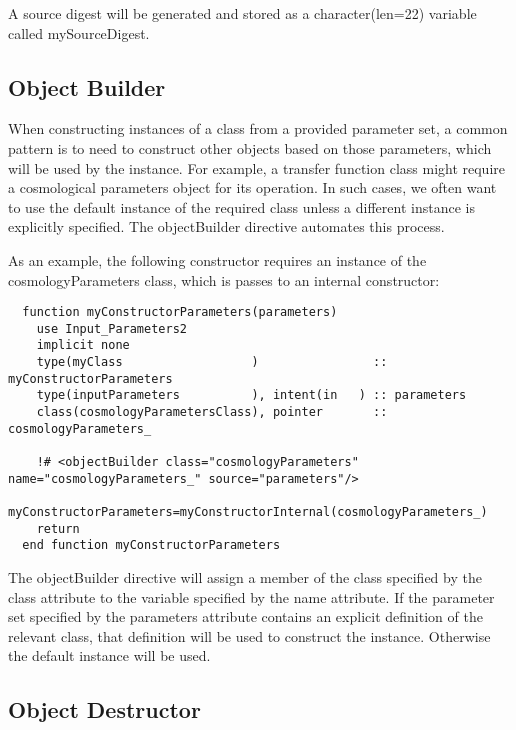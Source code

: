 A source digest will be generated and stored as a {\normalfont \ttfamily character(len=22)} variable called {\normalfont \ttfamily mySourceDigest}.

\subsection{Object Builder}

When constructing instances of a class from a provided parameter set, a common pattern is to need to construct other objects based on those parameters, which will be used by the instance. For example, a transfer function class might require a cosmological parameters object for its operation. In such cases, we often want to use the default instance of the required class unless a different instance is explicitly specified. The {\normalfont \ttfamily objectBuilder} directive automates this process.

As an example, the following constructor requires an instance of the {\normalfont \ttfamily cosmologyParameters} class, which is passes to an internal constructor:

\begin{lstlisting}  
  function myConstructorParameters(parameters)
    use Input_Parameters2
    implicit none
    type(myClass                  )                :: myConstructorParameters
    type(inputParameters          ), intent(in   ) :: parameters
    class(cosmologyParametersClass), pointer       :: cosmologyParameters_    

    !# <objectBuilder class="cosmologyParameters" name="cosmologyParameters_" source="parameters"/>
    myConstructorParameters=myConstructorInternal(cosmologyParameters_)
    return
  end function myConstructorParameters
\end{lstlisting}

The {\normalfont \ttfamily objectBuilder} directive will assign a member of the class specified by the {\normalfont \ttfamily class} attribute to the variable specified by the {\normalfont \ttfamily name} attribute. If the parameter set specified by the {\normalfont \ttfamily parameters} attribute contains an explicit definition of the relevant class, that definition will be used to construct the instance. Otherwise the default instance will be used.

\subsection{Object Destructor}

